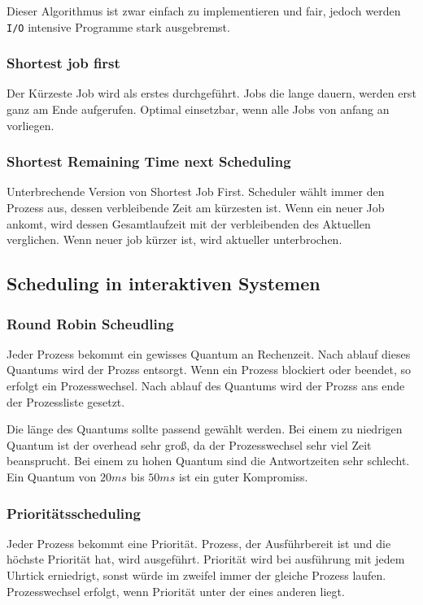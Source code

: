 Dieser Algorithmus ist zwar einfach zu implementieren und fair, jedoch werden \texttt{I/O} intensive Programme stark ausgebremst.

\subsubsection{Shortest job first}

Der Kürzeste Job wird als erstes durchgeführt. Jobs die lange dauern, werden erst ganz am Ende aufgerufen. Optimal einsetzbar, wenn alle Jobs von anfang an vorliegen.

\subsubsection{Shortest Remaining Time next Scheduling}

Unterbrechende Version von Shortest Job First. Scheduler wählt immer den Prozess aus, dessen verbleibende Zeit am kürzesten ist. Wenn ein neuer Job ankomt, wird dessen Gesamtlaufzeit mit der verbleibenden des Aktuellen verglichen. Wenn neuer job kürzer ist, wird aktueller unterbrochen.

\subsection{Scheduling in interaktiven Systemen}

\subsubsection{Round Robin Scheudling}

Jeder Prozess bekommt ein gewisses Quantum an Rechenzeit. Nach ablauf dieses Quantums wird der Prozss entsorgt. Wenn ein Prozess blockiert oder beendet, so erfolgt ein Prozesswechsel. Nach ablauf des Quantums wird der Prozss ans ende der Prozessliste gesetzt.

Die länge des Quantums sollte passend gewählt werden. Bei einem zu niedrigen Quantum ist der overhead sehr groß, da der Prozesswechsel sehr viel Zeit beansprucht. Bei einem zu hohen Quantum sind die Antwortzeiten sehr schlecht. Ein Quantum von $20ms$ bis $50ms$ ist ein guter Kompromiss.

\subsubsection{Prioritätsscheduling}

Jeder Prozess bekommt eine Priorität. Prozess, der Ausführbereit ist und die höchste Priorität hat, wird ausgeführt. Priorität wird bei ausführung mit jedem Uhrtick erniedrigt, sonst würde im zweifel immer der gleiche Prozess laufen. Prozesswechsel erfolgt, wenn Priorität unter der eines anderen liegt.

